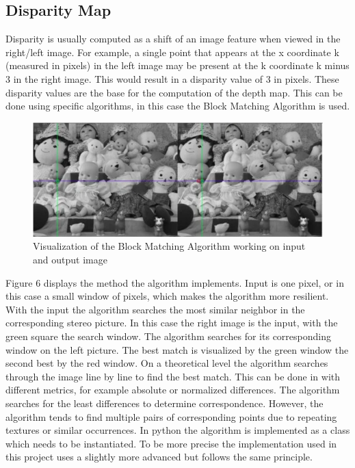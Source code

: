 \documentclass[journal,onecolumn]{IEEEtran}
\begin{document}
\subsection{Disparity Map}
\noindent
Disparity is usually computed as a shift of an image feature when viewed in the right/left image. For example, a single point that appears at the x coordinate k (measured in pixels) in the left image may be present at the k coordinate k minus 3 in the right image. This would result in a disparity value of 3 in pixels. These disparity values are the base for the computation of the depth map.
This can be done using specific algorithms, in this case the Block Matching Algorithm is used.
\begin{figure}[H]
	\centering
	\includegraphics[scale=0.5]{bma.png}
	\captionsetup{justification=centering}
	\caption{Visualization of the Block Matching Algorithm working on input and output image}
\end{figure}
\noindent
Figure 6 displays the method the algorithm implements. Input is one pixel, or in this case a small window of pixels, which makes the algorithm more resilient. With the input the algorithm searches the most similar neighbor in the corresponding stereo picture. In this case the right image is the input, with the green square the search window. The algorithm searches for its corresponding window on the left picture. The best match is visualized by the green window the second best by the red window.
On a theoretical level the algorithm searches through the image line by line to find the best match.
This can be done in with different metrics, for example absolute or normalized differences. The algorithm searches for the least differences to determine correspondence. However, the algorithm tends to find multiple pairs of corresponding points due to repeating textures or similar occurrences.
In python the algorithm is implemented as a class which needs to be instantiated. To be more precise the implementation used in this project uses a slightly more advanced\cite{SGBM} but follows the same principle.
\end{document}
